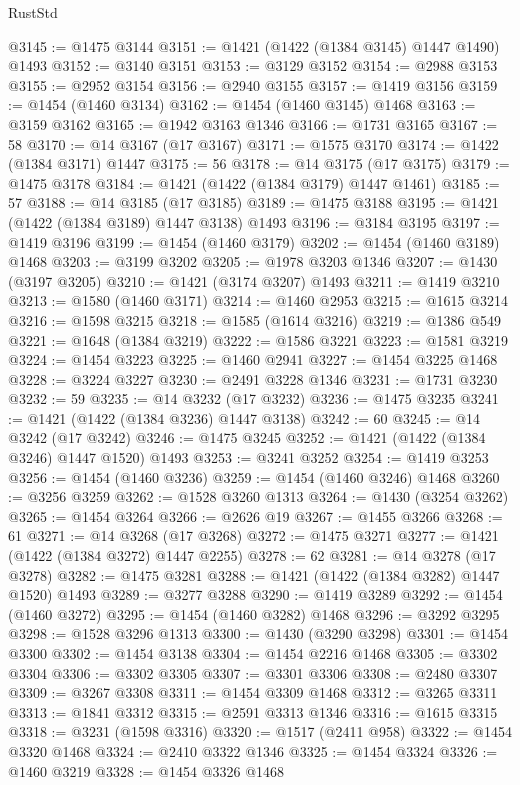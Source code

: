 \begin{lexlean}{RustStd}
\begin{coremodule}
@3145 := @1475 @3144
@3151 := @1421 (@1422 (@1384 @3145) @1447 @1490) @1493
@3152 := @3140 @3151
@3153 := @3129 @3152
@3154 := @2988 @3153
@3155 := @2952 @3154
@3156 := @2940 @3155
@3157 := @1419 @3156
@3159 := @1454 (@1460 @3134)
@3162 := @1454 (@1460 @3145) @1468
@3163 := @3159 @3162
@3165 := @1942 @3163 @1346
@3166 := @1731 @3165
@3167 := 58
@3170 := @14 @3167 (@17 @3167)
@3171 := @1575 @3170
@3174 := @1422 (@1384 @3171) @1447
@3175 := 56
@3178 := @14 @3175 (@17 @3175)
@3179 := @1475 @3178
@3184 := @1421 (@1422 (@1384 @3179) @1447 @1461)
@3185 := 57
@3188 := @14 @3185 (@17 @3185)
@3189 := @1475 @3188
@3195 := @1421 (@1422 (@1384 @3189) @1447 @3138) @1493
@3196 := @3184 @3195
@3197 := @1419 @3196
@3199 := @1454 (@1460 @3179)
@3202 := @1454 (@1460 @3189) @1468
@3203 := @3199 @3202
@3205 := @1978 @3203 @1346
@3207 := @1430 (@3197 @3205)
@3210 := @1421 (@3174 @3207) @1493
@3211 := @1419 @3210
@3213 := @1580 (@1460 @3171)
@3214 := @1460 @2953
@3215 := @1615 @3214
@3216 := @1598 @3215
@3218 := @1585 (@1614 @3216)
@3219 := @1386 @549
@3221 := @1648 (@1384 @3219)
@3222 := @1586 @3221
@3223 := @1581 @3219
@3224 := @1454 @3223
@3225 := @1460 @2941
@3227 := @1454 @3225 @1468
@3228 := @3224 @3227
@3230 := @2491 @3228 @1346
@3231 := @1731 @3230
@3232 := 59
@3235 := @14 @3232 (@17 @3232)
@3236 := @1475 @3235
@3241 := @1421 (@1422 (@1384 @3236) @1447 @3138)
@3242 := 60
@3245 := @14 @3242 (@17 @3242)
@3246 := @1475 @3245
@3252 := @1421 (@1422 (@1384 @3246) @1447 @1520) @1493
@3253 := @3241 @3252
@3254 := @1419 @3253
@3256 := @1454 (@1460 @3236)
@3259 := @1454 (@1460 @3246) @1468
@3260 := @3256 @3259
@3262 := @1528 @3260 @1313
@3264 := @1430 (@3254 @3262)
@3265 := @1454 @3264
@3266 := @2626 @19
@3267 := @1455 @3266
@3268 := 61
@3271 := @14 @3268 (@17 @3268)
@3272 := @1475 @3271
@3277 := @1421 (@1422 (@1384 @3272) @1447 @2255)
@3278 := 62
@3281 := @14 @3278 (@17 @3278)
@3282 := @1475 @3281
@3288 := @1421 (@1422 (@1384 @3282) @1447 @1520) @1493
@3289 := @3277 @3288
@3290 := @1419 @3289
@3292 := @1454 (@1460 @3272)
@3295 := @1454 (@1460 @3282) @1468
@3296 := @3292 @3295
@3298 := @1528 @3296 @1313
@3300 := @1430 (@3290 @3298)
@3301 := @1454 @3300
@3302 := @1454 @3138
@3304 := @1454 @2216 @1468
@3305 := @3302 @3304
@3306 := @3302 @3305
@3307 := @3301 @3306
@3308 := @2480 @3307
@3309 := @3267 @3308
@3311 := @1454 @3309 @1468
@3312 := @3265 @3311
@3313 := @1841 @3312
@3315 := @2591 @3313 @1346
@3316 := @1615 @3315
@3318 := @3231 (@1598 @3316)
@3320 := @1517 (@2411 @958)
@3322 := @1454 @3320 @1468
@3324 := @2410 @3322 @1346
@3325 := @1454 @3324
@3326 := @1460 @3219
@3328 := @1454 @3326 @1468

\end{coremodule}
\end{lexlean}
